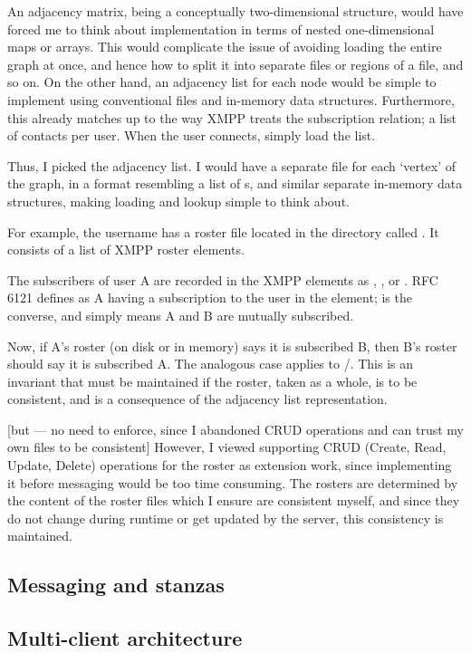 An adjacency matrix, being a conceptually two-dimensional structure, would have forced me to think about implementation in terms of nested one-dimensional maps or arrays. This would complicate the issue of avoiding loading the entire graph at once, and hence how to split it into separate files or regions of a file, and so on. On the other hand, an adjacency list for each node would be simple to implement using conventional files and in-memory data structures. Furthermore, this already matches up to the way XMPP treats the subscription relation; a list of contacts per user. When the user connects, simply load the list.

Thus, I picked the adjacency list. I would have a separate file for each `vertex' of the graph, in a format resembling a list of s, and similar separate in-memory data structures, making loading and lookup simple to think about.

For example, the username  has a roster file located in the  directory called . It consists of a list of XMPP roster  elements.

The subscribers of user A are recorded in the XMPP  elements as , , or . RFC 6121 defines  as A having a subscription to the user in the  element;  is the converse, and  simply means A and B are mutually subscribed.

Now, if A's roster (on disk or in memory) says it is subscribed  B, then B's roster should say it is subscribed  A. The analogous case applies to /. This is an invariant that must be maintained if the roster, taken as a whole, is to be consistent, and is a consequence of the adjacency list representation.

[but --- no need to enforce, since I abandoned CRUD operations and can trust my own files to be consistent]
However, I viewed supporting CRUD (Create, Read, Update, Delete) operations for the roster as extension work, since implementing it before messaging would be too time consuming. The rosters are determined by the content of the roster files which I ensure are consistent myself, and since they do not change during runtime or get updated by the server, this consistency is maintained.

\subsection{Messaging and stanzas}

\subsection{Multi-client architecture}

